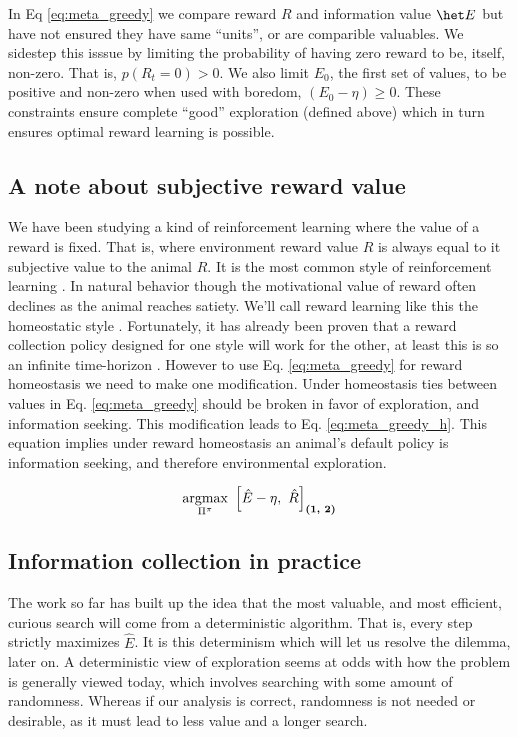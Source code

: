 
In Eq \ref{eq:meta_greedy} we compare reward $R$ and information value $\het E$ but have not ensured they have same ``units'', or are comparible valuables. We sidestep this isssue by limiting the probability of having zero reward to be, itself, non-zero. That is, $p(R_t=0) > 0$. We also limit $E_0$, the first set of values, to be positive and non-zero when used with boredom, $(E_0 - \eta) \geq 0$. These constraints ensure complete ``good'' exploration (defined above) which in turn ensures optimal reward learning is possible.

\subsection{A note about subjective reward value}
We have been studying a kind of reinforcement learning where the value of a reward is fixed. That is, where environment reward value $R$ is always equal to it subjective value to the animal $\hat R$. It is the most common style of reinforcement learning \citep{Sutton2018}. In natural behavior though the motivational value of reward often declines as the animal reaches satiety. We'll call reward learning like this the homeostatic style \citep{Keramati2014,Juechems2019,Munch2020}. Fortunately, it has already been proven that a reward collection policy designed for one style will work for the other, at least this is so an infinite time-horizon \citep{Keramati2014}. However to use Eq. \ref{eq:meta_greedy} for reward homeostasis we need to make one modification. Under homeostasis ties between values in Eq. \ref{eq:meta_greedy} should be broken in favor of exploration, and information seeking. This modification leads to Eq. \ref{eq:meta_greedy_h}. This equation implies under reward homeostasis an animal's default policy is information seeking, and therefore environmental exploration.

\begin{equation}
	\label{eq:meta_greedy_h} 
	\operatorname*{argmax}_{\Pi^{\pi}} \ \Big [ \hat E - \eta,\ \hat R \Big ]_{\textbf{(1, 2)}}
\end{equation}

\subsection{Information collection in practice}
The work so far has built up the idea that the most valuable, and most efficient, curious search will come from a deterministic algorithm. That is, every step strictly maximizes $\hat E$. It is this determinism which will let us resolve the dilemma, later on. A deterministic view of exploration seems at odds with how the problem is generally viewed today, which involves searching with some amount of randomness. Whereas if our analysis is correct, randomness is not needed or desirable, as it must lead to less value and a longer search. 

